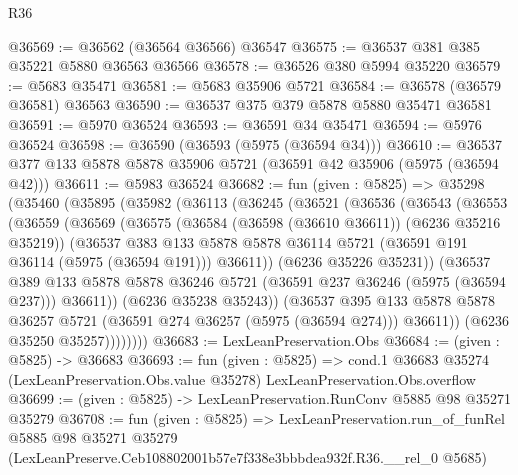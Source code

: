 \begin{lexlean}{R36}
\begin{coremodule}
@36569 := @36562 (@36564 @36566) @36547
@36575 := @36537 @381 @385 @35221 @5880 @36563 @36566
@36578 := @36526 @380 @5994 @35220
@36579 := @5683 @35471
@36581 := @5683 @35906 @5721
@36584 := @36578 (@36579 @36581) @36563
@36590 := @36537 @375 @379 @5878 @5880 @35471 @36581
@36591 := @5970 @36524
@36593 := @36591 @34 @35471
@36594 := @5976 @36524
@36598 := @36590 (@36593 (@5975 (@36594 @34)))
@36610 := @36537 @377 @133 @5878 @5878 @35906 @5721 (@36591 @42 @35906 (@5975 (@36594 @42)))
@36611 := @5983 @36524
@36682 := fun (given : @5825) =>
  @35298
    (@35460
      (@35895
        (@35982
          (@36113
            (@36245
              (@36521
                (@36536
                  (@36543
                    (@36553
                      (@36559
                        (@36569
                          (@36575
                            (@36584 (@36598 (@36610 @36611)) (@6236 @35216 @35219))
                            (@36537
                              @383
                              @133
                              @5878
                              @5878
                              @36114
                              @5721
                              (@36591 @191 @36114 (@5975 (@36594 @191)))
                              @36611))
                          (@6236 @35226 @35231))
                        (@36537
                          @389
                          @133
                          @5878
                          @5878
                          @36246
                          @5721
                          (@36591 @237 @36246 (@5975 (@36594 @237)))
                          @36611))
                      (@6236 @35238 @35243))
                    (@36537
                      @395
                      @133
                      @5878
                      @5878
                      @36257
                      @5721
                      (@36591 @274 @36257 (@5975 (@36594 @274)))
                      @36611))
                  (@6236 @35250 @35257))))))))
@36683 := LexLeanPreservation.Obs
@36684 := (given : @5825) -> @36683
@36693 := fun (given : @5825) =>
  cond.{1} @36683 @35274 (LexLeanPreservation.Obs.value @35278) LexLeanPreservation.Obs.overflow
@36699 := (given : @5825) -> LexLeanPreservation.RunConv @5885 @98 @35271 @35279
@36708 := fun (given : @5825) =>
  LexLeanPreservation.run_of_funRel
    @5885
    @98
    @35271
    @35279
    (LexLeanPreserve.Ceb108802001b57e7f338e3bbbdea932f.R36.__rel_0 @5685)
\end{coremodule}
\end{lexlean}
